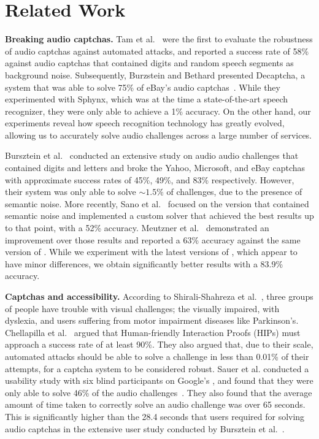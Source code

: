 \section{Related Work}
\label{sec:related}

\textbf{Breaking audio captchas.} Tam et al.~\cite{tam2008improving} were the 
first to evaluate the robustness of audio captchas against automated attacks,
and reported a success rate of 58\% against audio captchas that contained 
digits and random speech segments as background noise. Subsequently, 
Burzstein and Bethard presented Decaptcha, a system that was able to solve 75\%
of eBay's audio captchas~\cite{Bursztein2009}. While they experimented with Sphynx,
which was at the time a state-of-the-art speech recognizer, they were only able to 
achieve a 1\% accuracy. On the other hand, our experiments reveal how speech recognition
technology has greatly evolved, allowing us to accurately solve audio challenges
across a large number of services.

Bursztein et al.~\cite{bursztein2011failure} conducted an extensive study on audio audio 
challenges that contained digits and letters and broke the Yahoo, Microsoft, and eBay 
captchas with approximate success rates of 45\%, 49\%, and 83\% respectively. However, 
their system was only able to solve $\sim1.5\%$ of \re challenges, due to the presence 
of semantic noise. More recently, Sano et al.~\cite{Sano2013} focused on the \re
version that contained semantic noise and implemented a custom solver that achieved the best
results up to that point, with a 52\% accuracy. Meutzner et al.~\cite{meutzner2014using} demonstrated 
an improvement over those results and reported a 63\% accuracy against the same version of \re. While
we experiment with the latest versions of \re, which appear to have minor differences, 
we obtain significantly better results with a 83.9\% accuracy.

\textbf{Captchas and accessibility.} According to Shirali-Shahreza et al.~\cite{shirali2011accessibility},
three groups of people have trouble with visual challenges; the visually impaired,
with dyslexia, and users suffering from motor impairment diseases like Parkinson's.
Chellapilla et al.~\cite{Chellapilla} argued that Human-friendly Interaction Proofs (HIPs)
must approach a success rate of at least 90\%. They also argued that, due to their scale, automated attacks
should be able to solve a challenge in less than 0.01\% of their attempts, for a captcha system to be considered
robust. Sauer et al. conducted a usability study with six blind participants on Google's \re, 
and found that they were only able to solve 46\% of the audio challenges~\cite{sauer2008towards}.
They also found that the average amount of time taken to correctly solve an audio challenge was over 65 seconds.
This is significantly higher than the 28.4 seconds that users required for solving audio captchas
in the extensive user study conducted by Bursztein et al.~\cite{captchas-are-hard}.

